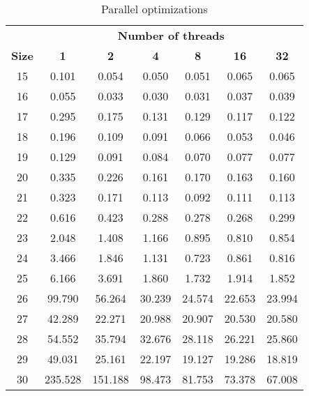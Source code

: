 \documentclass[conference]{IEEEtran}
\begin{document}
\begin{table}[htbp]
\caption{Parallel optimizations}
\begin{center}
\begin{tabular}{|c|c|c|c|c|c|c|}
\hline
\textbf{}&\multicolumn{6}{|c|}{\textbf{Number of threads}} \\
\cline{2-7} 
\textbf{Size} & \textbf{1}& \textbf{2}& \textbf{4}& \textbf{8}& \textbf{16}& \textbf{32}\\
\hline
15& 0.101 & 0.054& 0.050& 0.051& 0.065& 0.065\\
16& 0.055 & 0.033 &0.030 &0.031 &0.037 &0.039 \\
17& 0.295 &0.175 &0.131 &0.129 &0.117 &0.122 \\
18& 0.196 &0.109 &0.091 &0.066 &0.053 &0.046 \\
19& 0.129 &0.091 &0.084 &0.070 &0.077 &0.077 \\
20& 0.335 &0.226 &0.161 &0.170 &0.163 &0.160 \\
21& 0.323 &0.171 &0.113 &0.092 &0.111 &0.113 \\
22& 0.616 &0.423 &0.288 &0.278 &0.268 &0.299 \\
23& 2.048 &1.408 &1.166 &0.895 &0.810 &0.854 \\
24& 3.466 &1.846 &1.131 &0.723 &0.861 &0.816 \\
25& 6.166 &3.691 &1.860 &1.732 &1.914 &1.852 \\
26& 99.790 &56.264 &30.239 &24.574 &22.653 &23.994 \\
27& 42.289 &22.271 &20.988 &20.907 &20.530 &20.580 \\
28& 54.552 &35.794 &32.676 &28.118 &26.221 &25.860 \\
29& 49.031 &25.161 &22.197 &19.127 &19.286 &18.819 \\
30& 235.528 &151.188 &98.473 &81.753 &73.378 &67.008 \\
\hline
\end{tabular}
\label{tab2}
\end{center}
\end{table}
\end{document}
